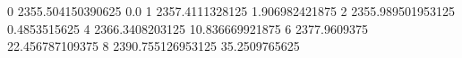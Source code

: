 0 2355.504150390625 0.0
1 2357.4111328125 1.906982421875
2 2355.989501953125 0.4853515625
4 2366.3408203125 10.836669921875
6 2377.9609375 22.456787109375
8 2390.755126953125 35.2509765625
